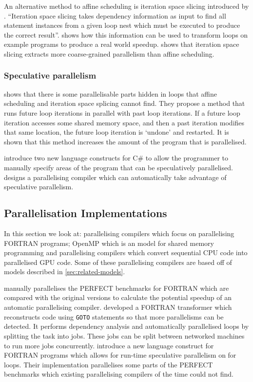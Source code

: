 An alternative method to affine scheduling is iteration space slicing introduced by \textcite{Pugh1997}. ``Iteration space slicing takes dependency information as input to find all statement instances from a given loop nest which must be executed to produce the correct result''. \textcite{Pugh1997} shows how this information can be used to transform loops on example programs to produce a real world speedup. \textcite{Beletska2011} shows that iteration space slicing extracts more coarse-grained parallelism than affine scheduling.

\subsubsection{Speculative parallelism}
\textcite{Zhong2008} shows that there is some parallelisable parts hidden in loops that affine scheduling and iteration space splicing cannot find. They propose a method that runs future loop iterations in parallel with past loop iterations. If a future loop iteration accesses some shared memory space, and then a past iteration modifies that same location, the future loop iteration is `undone' and restarted. It is shown that this method increases the amount of the program that is parallelised.

\textcite{Prabhu2010} introduce two new language constructs for C\# to allow the programmer to manually specify areas of the program that can be speculatively parallelised. \textcite{Yiapanis2015} designs a parallelising compiler which can automatically take advantage of speculative parallelism.

\subsection{Parallelisation Implementations}
In this section we look at: parallelising compilers which focus on parallelising FORTRAN programs; OpenMP which is an model for shared memory programming and parallelising compilers which convert sequential CPU code into parallelised GPU code. Some of these parallelising compilers are based off of models described in \autoref{sec:related-models}.

\textcite{Eigenmann1998} manually parallelises the PERFECT benchmarks for FORTRAN which are compared with the original versions to calculate the potential speedup of an automatic parallelising compiler.
\textcite{DHollander1998} developed a FORTRAN transformer which reconstructs code using \texttt{GOTO} statements so that more parallelisms can be detected. It performs dependency analysis and automatically parallelised loops by splitting the task into jobs. These jobs can be split between networked machines to run more jobs concurrently.
\textcite{Rauchwerger1999} introduce a new language construct for FORTRAN programs which allows for run-time speculative parallelism on for loops. Their implementation parallelises some parts of the PERFECT benchmarks which existing parallelising compilers of the time could not find.

